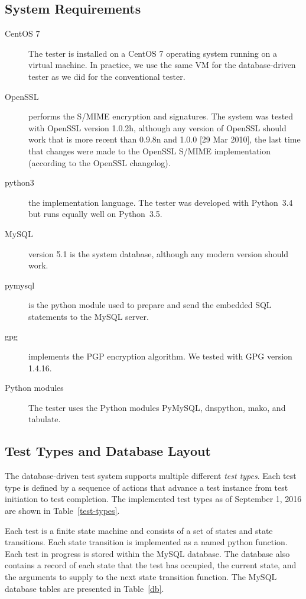 \documentclass[preprint,3p,11pt]{elsarticle}
\begin{document}
\subsection{System Requirements}

\begin{description}
\item[CentOS 7] The tester is installed on a CentOS 7 operating
  system running on a virtual machine. In practice, we use the same VM
  for the database-driven tester as we did for the conventional tester.
\item[OpenSSL] performs the S/MIME encryption and
signatures. The system was tested with OpenSSL version 1.0.2h, although any
version of OpenSSL should work that is more recent than 0.9.8n and
1.0.0 [29 Mar 2010], the last time that changes were made to the OpenSSL
S/MIME implementation (according to the OpenSSL changelog). 

\item[python3] the implementation language. The tester was developed
  with Python~3.4 but runs equally well on Python~3.5.

\item[MySQL] version 5.1 is the system database,
although any modern version should work. 

\item[pymysql] is the python module used to prepare and send the embedded SQL
statements to the MySQL server.

\item[gpg] implements the PGP encryption
algorithm. We tested with GPG version 1.4.16.

\item[Python modules] The tester uses the Python modules PyMySQL,
dnspython, mako, and tabulate.
\end{description}

\subsection{Test Types and Database Layout}
The database-driven test system supports multiple different
\emph{test types}. Each test type is defined by a sequence of actions
that advance a test instance from test initiation to test
completion. The implemented test types as of September 1, 2016 are shown in
Table~\ref{test-types}. 

Each test is a finite state machine and consists of a
set of states and state transitions. Each state transition is
implemented as a named python function. Each test in progress is
stored within the MySQL database. The database also contains a record
of each state that the test has occupied, the current state, and the
arguments to supply to the next state transition function. The MySQL
database tables are presented in Table~\ref{db}. 
\end{document}
